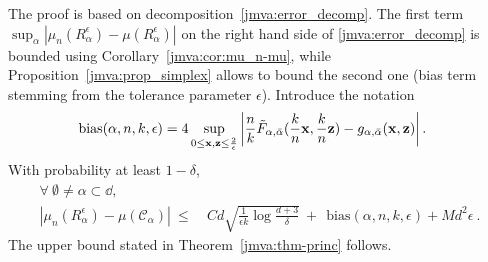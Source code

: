 The proof is based on decomposition~\eqref{jmva:error_decomp}. %
The first term $\sup_\alpha|\mu_n(R_\alpha^\epsilon)-\mu(R_\alpha^\epsilon)|$
on the right hand side of \eqref{jmva:error_decomp} is bounded using
Corollary~\ref{jmva:cor:mu_n-mu}, while Proposition~\ref{jmva:prop_simplex}
allows to bound the second one 
(bias term stemming from the tolerance parameter $\epsilon$). 
Introduce the notation 
\begin{align}
\label{jmva:eq:bias}
\text{bias}(\alpha,n,k,\epsilon) &= 4\sup_{0 \le \mathbf x, \mathbf z \le \frac{2}{\epsilon}}\left|\frac{n}{k} \tilde F_{\alpha, \bar \alpha }( \frac{k}{n} \mathbf x, \frac{k}{n} \mathbf z)- g_{\alpha, \bar \alpha }(\mathbf x, \mathbf z)\right|.
\end{align}
\noindent
With probability at least $1-\delta$,  %
\begin{align*}
\forall~ \emptyset \neq \alpha\subset\dd,~~~~~~~~\\ \left|\mu_n(R_\alpha^\epsilon) - \mu(\mathcal{C}_\alpha)\right| ~\le~& 
Cd\sqrt{\frac{1}{\epsilon k}\log\frac{d+3}{\delta}}~+~ ~\text{bias}(\alpha,n,k,\epsilon) + M d^2  \epsilon~.
\end{align*}
The upper bound stated in
Theorem~\ref{jmva:thm-princ} follows.%

